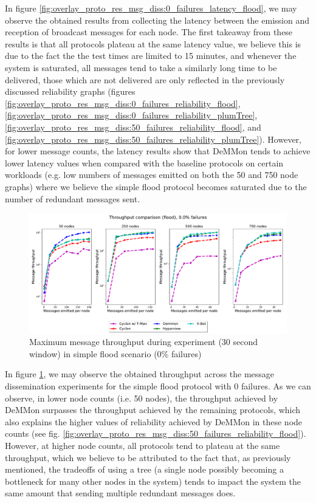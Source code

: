 In figure \ref{fig:overlay_proto_res_msg_diss:0_failures_latency_flood}, we may observe the obtained results from collecting the latency between the emission and reception of broadcast messages for each node. The first takeaway from these results is that all protocols plateau at the same latency value, we believe this is due to the fact the the test times are limited to 15 minutes, and whenever the system is saturated, all messages tend to take a similarly long time to be delivered, those which are not delivered are only reflected in the previously discussed reliability graphs (figures \ref{fig:overlay_proto_res_msg_diss:0_failures_reliability_flood}, \ref{fig:overlay_proto_res_msg_diss:0_failures_reliability_plumTree}, \ref{fig:overlay_proto_res_msg_diss:50_failures_reliability_flood}, and \ref{fig:overlay_proto_res_msg_diss:50_failures_reliability_plumTree}). However, for lower message counts, the latency results show that DeMMon tends to achieve lower latency values when compared with the baseline protocols on certain workloads (e.g. low numbers of messages emitted on both the 50 and 750 node graphs) where we believe the simple flood protocol becomes saturated due to the number of redundant messages sent.

\begin{figure}[htbp]
    \centering
    \includegraphics[width=\linewidth]{Chapters/evaluation/figures/flood/flood_0.0_failures_throughput.pdf}
    \caption{Maximum message throughput during experiment (30 second window) in simple flood scenario (0\% failures)}
    \label{fig:overlay_proto_res_msg_diss:0_failures_throughput_flood}
\end{figure}

In figure \ref{fig:overlay_proto_res_msg_diss:0_failures_throughput_flood}, we may observe the obtained throughput across the message dissemination experiments for the simple flood protocol with 0 failures. As we can observe, in lower node counts (i.e. 50 nodes), the throughput achieved by DeMMon surpasses the throughput achieved by the remaining protocols, which also explains the higher values of reliability achieved by DeMMon in these node counts (see fig. \ref{fig:overlay_proto_res_msg_diss:50_failures_reliability_flood}). However, at higher node counts, all protocols tend to plateau at the same throughput, which we believe to be attributed to the fact that, as previously mentioned, the tradeoffs of using a tree (a single node possibly becoming a bottleneck for many other nodes in the system) tends to impact the system the same amount that sending multiple redundant messages does.

